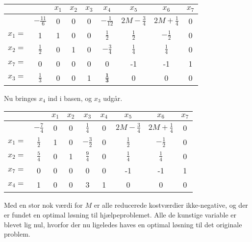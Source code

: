 \begin{eks}
\begin{center}
\begin{tabular}{|c|c|ccccccc|}
\hline
	 &  & $x_1$ & $x_2$ & $x_3$ & $x_4$ & $x_5$ & $x_6$ & $x_7$ \\
\hline
	 & $- \frac{11}{6}$ & 0 & 0 & 0 & $-\frac{1}{12}$ & $2M-\frac{3}{4}$ & $2M+ \frac{1}{4}$ & 0 \\
\hline
	$x_1=$ & 1 & 1 & 0 & 0 & $\frac{1}{2}$ & $\frac{1}{2}$ & $-\frac{1}{2}$ & 0 \\
	$x_2=$ & $\frac{1}{2}$ & 0 & 1 & 0 & $-\frac{3}{4}$ & $\frac{1}{4}$ & $\frac{1}{4}$ & 0 \\
	$x_7=$ & 0 & 0 & 0 & 0 & 0 & -1 & -1 & 1 \\
	$x_3=$ & $\frac{1}{3}$ & 0 & 0 & 1 & $\mathbf{\frac{1}{3}}$ & 0 & 0 & 0 \\
\hline
\end{tabular}
\end{center}

Nu bringes $x_4$ ind i basen, og $x_3$ udgår. 

\begin{center}
\begin{tabular}{|c|c|ccccccc|}
\hline
	 &  & $x_1$ & $x_2$ & $x_3$ & $x_4$ & $x_5$ & $x_6$ & $x_7$ \\
\hline
	 & $- \frac{7}{4}$ & 0 & 0 & $\frac{1}{4}$ & 0 & $2M-\frac{3}{4}$ & $2M+ \frac{1}{4}$ & 0 \\
\hline
	$x_1=$ & $\frac{1}{2}$ & 1 & 0 & $-\frac{3}{2}$ & 0 & $\frac{1}{2}$ & $-\frac{1}{2}$ & 0 \\
	$x_2=$ & $\frac{5}{4}$ & 0 & 1 & $\frac{9}{4}$ & 0 & $\frac{1}{4}$ & $\frac{1}{4}$ & 0 \\
	$x_7=$ & 0 & 0 & 0 & 0 & 0 & -1 & -1 & 1 \\
	$x_4=$ & 1 & 0 & 0 & 3 & 1 & 0 & 0 & 0 \\
\hline
\end{tabular}
\end{center}

Med en stor nok værdi for $M$ er alle reducerede kostværdier ikke-negative, og der er fundet en optimal løsning til hjælpeproblemet.
Alle de kunstige variable er blevet lig nul, hvorfor der nu ligeledes haves en optimal løsning til det originale problem.  
\end{eks}